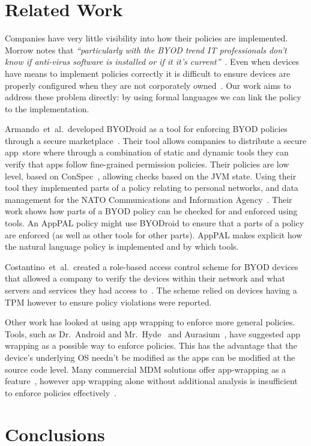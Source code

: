 \documentclass{easychair}
\makeatletter
\newcommand{\etal}{et~al.\@}
\makeatother
\begin{document}
\section{Related Work}
\label{sec:related}

Companies have very little visibility into how their policies are implemented.
Morrow notes that \emph{``particularly with the BYOD trend IT professionals don't know if anti-virus software is installed or if it it's current''}~\cite{morrow_byod_2012}.
Even when devices have means to implement policies correctly it is difficult to ensure devices are properly configured when they are not corporately owned~\cite{tokuyoshi_security_2013}.
Our work aims to address these problem directly: by using formal languages we can link the policy to the implementation.

Armando~\etal~developed BYODroid as a tool for enforcing BYOD policies through a secure marketplace~\cite{armando_enabling_2014}.
Their tool allows companies to distribute a secure app~store where through a combination of static and dynamic tools they can verify that apps follow fine-grained permission policies.
Their policies are low level, based on ConSpec~\cite{aktug_conspec_2008}, allowing checks based on the JVM state.
Using their tool they implemented parts of a policy relating to personal networks, and data management for the NATO Communications and Information Agency~\cite{armando_developing_2016}.
Their work shows how parts of a BYOD policy can be checked for and enforced using tools.
An AppPAL policy might use BYODroid to ensure that a parts of a policy are enforced (as well as other tools for other parts).
AppPAL makes explicit how the natural language policy is implemented and by which tools.

Costantino~\etal~created a role-based access control scheme for BYOD devices that allowed a company to verify the devices within their network and what servers and services they had access to~\cite{costantino_towards_2013}. The scheme relied on devices having a TPM however to ensure policy violations were reported.

Other work has looked at using app wrapping to enforce more general policies.
Tools, such as Dr.~Android and Mr.~Hyde~\cite{jeon_dr._2012} and Aurasium~\cite{xu_aurasium:_2012}, have suggested app wrapping as a possible way to enforce policies.
This has the advantage that the device's underlying OS needn't be modified as the apps can be modified at the source code level.
Many commercial \ac{MDM} solutions offer app-wrapping as a feature~\cite{_ibm_????,_app_????}, however app wrapping alone without additional analysis is insufficient to enforce policies effectively~\cite{hao_effectiveness_2013}.



\section{Conclusions}
\label{sec:conclusions}



{}

\end{document}
